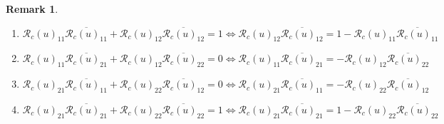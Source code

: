 \documentclass[aps,preprint]{revtex4}%
\newtheorem{remark}[theorem]{Remark}
\begin{document}
\begin{remark}
\begin{enumerate}
\begin{enumerate}
\item
\begin{equation}
\mathcal{R}_{c}\left(  u\right)  _{11}\overline{\mathcal{R}_{c}\left(
u\right)  _{11}}+\mathcal{R}_{c}\left(  u\right)  _{12}\overline
{\mathcal{R}_{c}\left(  u\right)  _{12}}=1\Leftrightarrow\mathcal{R}%
_{c}\left(  u\right)  _{12}\overline{\mathcal{R}_{c}\left(  u\right)  _{12}%
}=1-\mathcal{R}_{c}\left(  u\right)  _{11}\overline{\mathcal{R}_{c}\left(
u\right)  _{11}}%
\end{equation}


\item
\begin{equation}
\mathcal{R}_{c}\left(  u\right)  _{11}\overline{\mathcal{R}_{c}\left(
u\right)  _{21}}+\mathcal{R}_{c}\left(  u\right)  _{12}\overline
{\mathcal{R}_{c}\left(  u\right)  _{22}}=0\Leftrightarrow\mathcal{R}%
_{c}\left(  u\right)  _{11}\overline{\mathcal{R}_{c}\left(  u\right)  _{21}%
}=-\mathcal{R}_{c}\left(  u\right)  _{12}\overline{\mathcal{R}_{c}\left(
u\right)  _{22}}%
\end{equation}


\item
\begin{equation}
\mathcal{R}_{c}\left(  u\right)  _{21}\overline{\mathcal{R}_{c}\left(
u\right)  _{11}}+\mathcal{R}_{c}\left(  u\right)  _{22}\overline
{\mathcal{R}_{c}\left(  u\right)  _{12}}=0\Leftrightarrow\mathcal{R}%
_{c}\left(  u\right)  _{21}\overline{\mathcal{R}_{c}\left(  u\right)  _{11}%
}=-\mathcal{R}_{c}\left(  u\right)  _{22}\overline{\mathcal{R}_{c}\left(
u\right)  _{12}}%
\end{equation}


\item
\begin{equation}
\mathcal{R}_{c}\left(  u\right)  _{21}\overline{\mathcal{R}_{c}\left(
u\right)  _{21}}+\mathcal{R}_{c}\left(  u\right)  _{22}\overline
{\mathcal{R}_{c}\left(  u\right)  _{22}}=1\Leftrightarrow\mathcal{R}%
_{c}\left(  u\right)  _{21}\overline{\mathcal{R}_{c}\left(  u\right)  _{21}%
}=1-\mathcal{R}_{c}\left(  u\right)  _{22}\overline{\mathcal{R}_{c}\left(
u\right)  _{22}}%
\end{equation}

\end{enumerate}


\end{enumerate}
\end{remark}
\end{document}
